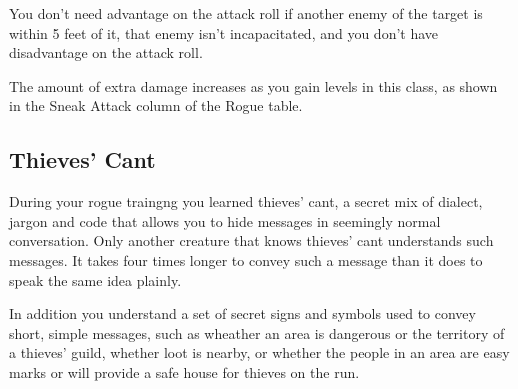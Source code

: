 \documentclass[a4paper,openany,twocolumn]{dndbook}
\begin{document}
You don't need advantage on the attack roll if another enemy of the target is within 5 feet of it, that enemy isn't incapacitated, and you don't have disadvantage on the attack roll.

The amount of extra damage increases as you gain levels in this class, as shown in the Sneak Attack column of the Rogue table.

\subsection*{Thieves' Cant}
During your rogue traingng you learned thieves' cant, a secret mix of dialect, jargon and code that allows you to hide messages in seemingly normal conversation. Only another creature that knows thieves' cant understands such messages. It takes four times longer to convey such a message than it does to speak the same idea plainly.

In addition you understand a set of secret signs and symbols used to convey short, simple messages, such as wheather an area is dangerous or the territory of a thieves' guild, whether loot is nearby, or whether the people in an area are easy marks or will provide a safe house for thieves on the run.
\end{document}
